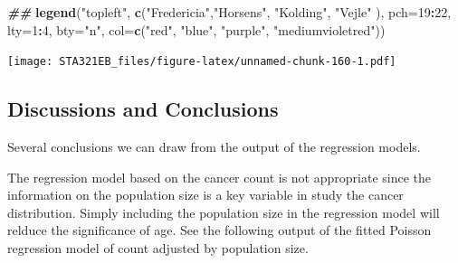 \documentclass[
]{book}
\newenvironment{Shaded}{\begin{snugshade}}{\end{snugshade}}
\newcommand{\AttributeTok}[1]{\textcolor[rgb]{0.13,0.29,0.53}{#1}}
\newcommand{\DecValTok}[1]{\textcolor[rgb]{0.00,0.00,0.81}{#1}}
\newcommand{\DocumentationTok}[1]{\textcolor[rgb]{0.56,0.35,0.01}{\textbf{\textit{#1}}}}
\newcommand{\FunctionTok}[1]{\textcolor[rgb]{0.13,0.29,0.53}{\textbf{#1}}}
\newcommand{\NormalTok}[1]{#1}
\newcommand{\OtherTok}[1]{\textcolor[rgb]{0.56,0.35,0.01}{#1}}
\newcommand{\SpecialCharTok}[1]{\textcolor[rgb]{0.81,0.36,0.00}{\textbf{#1}}}
\newcommand{\StringTok}[1]{\textcolor[rgb]{0.31,0.60,0.02}{#1}}
\begin{document}
\begin{Shaded}
\begin{Highlighting}[]
\DocumentationTok{\#\#}
\FunctionTok{legend}\NormalTok{(}\StringTok{"topleft"}\NormalTok{, }\FunctionTok{c}\NormalTok{(}\StringTok{"Fredericia"}\NormalTok{,}\StringTok{"Horsens"}\NormalTok{, }\StringTok{"Kolding"}\NormalTok{, }\StringTok{"Vejle"}\NormalTok{ ),}
                  \AttributeTok{pch=}\DecValTok{19}\SpecialCharTok{:}\DecValTok{22}\NormalTok{, }\AttributeTok{lty=}\DecValTok{1}\SpecialCharTok{:}\DecValTok{4}\NormalTok{,  }\AttributeTok{bty=}\StringTok{"n"}\NormalTok{, }
        \AttributeTok{col=}\FunctionTok{c}\NormalTok{(}\StringTok{"red"}\NormalTok{, }\StringTok{"blue"}\NormalTok{, }\StringTok{"purple"}\NormalTok{, }\StringTok{"mediumvioletred"}\NormalTok{))}
\end{Highlighting}
\end{Shaded}

\texttt{[image: STA321EB\_files/figure-latex/unnamed-chunk-160-1.pdf]}

\hypertarget{discussions-and-conclusions}{%
\subsection{Discussions and Conclusions}\label{discussions-and-conclusions}}

Several conclusions we can draw from the output of the regression models.

The regression model based on the cancer count is not appropriate since the information on the population size is a key variable in study the cancer distribution. Simply including the population size in the regression model will relduce the significance of age. See the following output of the fitted Poisson regression model of count adjusted by population size.

\begin{Shaded}
\end{Shaded}
\end{document}
